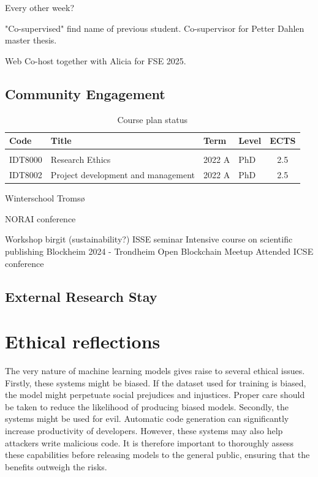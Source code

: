 \documentclass{article}
\begin{document}
Every other week?

"Co-supervised" find name of previous student.
Co-supervisor for Petter Dahlen master thesis.

Web Co-host together with Alicia for FSE 2025.

\subsection{Community Engagement}

\begin{table}[htp]
    \newcommand\T{\rule{0pt}{2.6ex}}       %
    \newcommand\B{\rule[-1.2ex]{0pt}{0pt}} %
    \centering
    \caption{Course plan status}
    \label{tab:my_label}
    
    \begin{tabularx}{\textwidth}{lllXc}
        \toprule
        \textbf{Code} & \textbf{Title} & \textbf{Term} & \textbf{Level} & \textbf{ECTS}\\
        \midrule
        \multicolumn{5}{l}{\cellcolor{green!20}{\textbf{Completed}}} \bigstrut\\
        \T IDT8000 & Research Ethics & 2022 A & PhD & 2.5\\
        IDT8002 & Project development and management & 2022 A & PhD & 2.5\\
        
    \end{tabularx}
\end{table}

Winterschool Tromsø


NORAI conference

Workshop birgit (sustainability?)
ISSE seminar
Intensive course on scientific publishing
Blockheim 2024 - Trondheim Open Blockchain Meetup
Attended ICSE conference


\subsection{External Research Stay}



\section{Ethical reflections}
The very nature of machine learning models gives raise to several ethical issues. Firstly, these systems might be biased. If the dataset used for training is biased, the model might perpetuate social prejudices and injustices. Proper care should be taken to reduce the likelihood of producing biased models. Secondly, the systems might be used for evil. Automatic code generation can significantly increase productivity of developers. However, these systems may also help attackers write malicious code. It is therefore important to thoroughly assess these capabilities before releasing models to the general public, ensuring that the benefits outweigh the risks.
\end{document}
